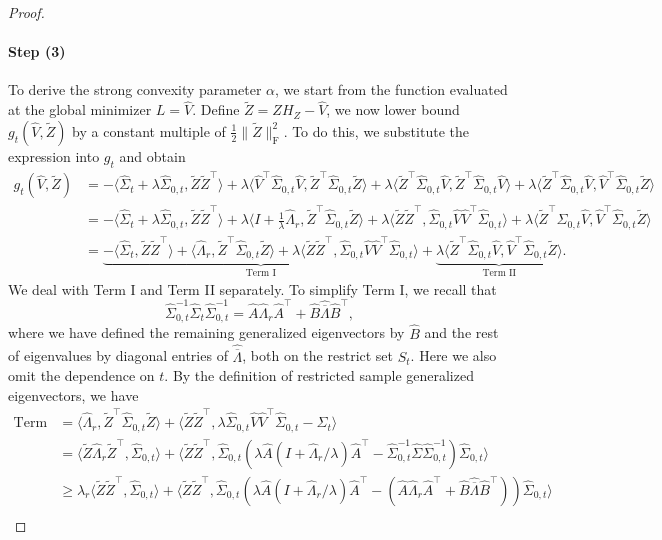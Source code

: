 \documentclass[11pt]{article}
\newcommand{\LambdaRest}{\overline{\Lambda}} %
\newcommand{\ha}{\widehat{A}}
\newcommand{\hb}{\widehat{B}}
\newcommand{\hl}{\widehat{\Lambda}_r}
\newcommand{\hU}{\widehat{V}}
\newcommand{\has}{\widehat{\LambdaRest}}
\newcommand{\sot}{\widehat{\Sigma}_{0,t}}
\newcommand{\0}{{\mathbf{0}}}
\newcommand{\tZ}{{\widetilde{Z}}}
\begin{document}
\begin{proof}
\paragraph{Step (3)} 
To derive the strong convexity parameter $\alpha$, we start from the function evaluated at the global minimizer $L=\hU$. Define $\tZ = ZH_Z-\hU$, we now lower bound $g_t(\hU,\tZ)$ by a constant multiple of $\frac{1}{2}\|\tZ\|_\mathrm{F}^2$. To do this, we substitute the expression into $g_t$ and obtain\begin{align*}
    g_t(\widehat{V},\tZ)&=-\langle \widehat{\Sigma}_t+\lambda\sot,\tZ\tZ^\top  \rangle +\lambda\langle \hU^\top  \sot\hU,\tZ^\top  \sot \tZ\rangle +\lambda\langle \tZ^\top  \sot \hU, \tZ^\top  \sot\hU\rangle+\lambda \langle \tZ^\top\sot \hU,\hU^\top\sot \tZ\rangle\\
    &=-\langle \widehat{\Sigma}_t+\lambda\sot,\tZ\tZ^\top  \rangle+\lambda\langle I+\frac{1}{\lambda}\hl,\tZ^\top  \sot \tZ\rangle +\lambda\langle \tZ\tZ^\top  ,\sot \hU\hU^\top  \sot\rangle +\lambda \langle \tZ^\top\sot \hU,\hU^\top\sot \tZ\rangle\\
    &=\underbrace{-\langle \widehat{\Sigma}_t,\tZ\tZ^\top  \rangle +\langle \hl,\tZ^\top  \sot \tZ\rangle +\lambda\langle \tZ\tZ^\top  ,\sot \hU\hU^\top  \sot\rangle}_{\text{Term I}}+\underbrace{\lambda \langle \tZ^\top\sot \hU,\hU^\top\sot \tZ\rangle}_{\text{Term II}}.
\end{align*}
We deal with Term I and Term II separately. To simplify Term I, we recall that 
\begin{equation*}
    \sot^{-1}\widehat{\Sigma}_t\sot^{-1}  =\ha\hl\ha^\top  +\hb\has\hb^\top,  
\end{equation*}
where we have defined the remaining generalized eigenvectors by $\hb$ and the rest of eigenvalues by diagonal entries of $\has$, both on the restrict set $S_t$. 
Here we also omit the dependence on $t$. 
By the definition of restricted sample generalized eigenvectors, we have 
\begin{align*}
\text{Term I}
& = \langle \hl ,\tZ^\top  \sot \tZ\rangle +\langle \tZ\tZ^\top  ,\lambda\sot \hU\hU^\top  \sot-\widehat{\Sigma}_t\rangle \\
& = \langle \tZ\hl \tZ^\top  ,\sot\rangle +\langle \tZ\tZ^\top  ,\sot(\lambda \ha (I+\hl/\lambda)\ha ^\top  - \sot^{-1}\widehat{\Sigma}\sot^{-1}) \sot\rangle\\
& \geq \widehat{\lambda}_r\langle \tZ\tZ^\top  ,\sot\rangle+\langle \tZ\tZ^\top  ,\sot(\lambda \ha (I+\hl/\lambda)\ha ^\top  -(\ha \hl\ha ^\top  +\hb \has\hb ^\top  )) \sot\rangle\\

\end{align*}
\end{proof}
\end{document}
